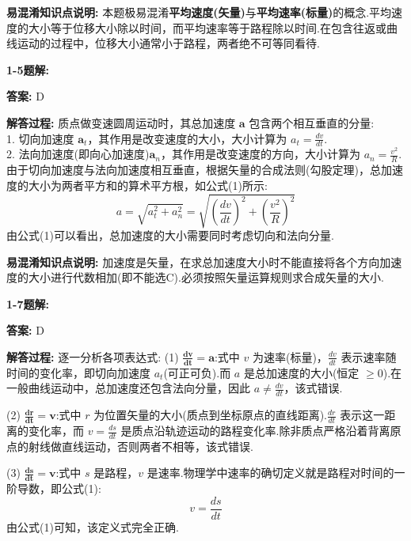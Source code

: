 \textbf{易混淆知识点说明:}
本题极易混淆\textbf{平均速度(矢量)}与\textbf{平均速率(标量)}的概念.平均速度的大小等于位移大小除以时间，而平均速率等于路程除以时间.在包含往返或曲线运动的过程中，位移大小通常小于路程，两者绝不可等同看待.

\vspace{2em}

\textbf{1-5题解:}


\textbf{答案:} D

\textbf{解答过程:}
质点做变速圆周运动时，其总加速度 $\mathbf{a}$ 包含两个相互垂直的分量:\\
1. 切向加速度 $\mathbf{a}_t$，其作用是改变速度的大小，大小计算为 $a_t = \frac{dv}{dt}$.\\
2. 法向加速度(即向心加速度)$\mathbf{a}_n$，其作用是改变速度的方向，大小计算为 $a_n = \frac{v^2}{R}$.
由于切向加速度与法向加速度相互垂直，根据矢量的合成法则(勾股定理)，总加速度的大小为两者平方和的算术平方根，如公式(1)所示:
\begin{equation}
	a = \sqrt{a_t^2 + a_n^2} = \sqrt{\left(\frac{dv}{dt}\right)^2 + \left(\frac{v^2}{R}\right)^2}
\end{equation}
由公式(1)可以看出，总加速度的大小需要同时考虑切向和法向分量.

\textbf{易混淆知识点说明:}
加速度是矢量，在求总加速度大小时不能直接将各个方向加速度的大小进行代数相加(即不能选C).必须按照矢量运算规则求合成矢量的大小.

\vspace{2em}

\textbf{1-7题解:}


\textbf{答案:} D

\textbf{解答过程:}
逐一分析各项表达式:
(1) $\mathbf{\frac{dv}{dt} = a}$:式中 $v$ 为速率(标量)，$\frac{dv}{dt}$ 表示速率随时间的变化率，即切向加速度 $a_t$(可正可负).而 $a$ 是总加速度的大小(恒定 $\ge 0$).在一般曲线运动中，总加速度还包含法向分量，因此 $a \neq \frac{dv}{dt}$，该式错误.

(2) $\mathbf{\frac{dr}{dt} = v}$:式中 $r$ 为位置矢量的大小(质点到坐标原点的直线距离).$\frac{dr}{dt}$ 表示这一距离的变化率，而 $v = \frac{ds}{dt}$ 是质点沿轨迹运动的路程变化率.除非质点严格沿着背离原点的射线做直线运动，否则两者不相等，该式错误.

(3) $\mathbf{\frac{ds}{dt} = v}$:式中 $s$ 是路程，$v$ 是速率.物理学中速率的确切定义就是路程对时间的一阶导数，即公式(1):
\begin{equation}
	v = \frac{ds}{dt}
\end{equation}
由公式(1)可知，该定义式完全正确.

